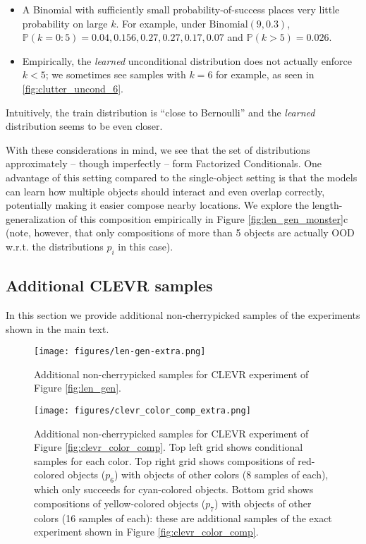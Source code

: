 \vspace{-1em}
\begin{itemize}
\item A Binomial with sufficiently small probability-of-success places very little probability on large $k$. For example, under $\text{Binomial}(9, 0.3)$, $\mathbb{P}(k=0:5) = 0.04, 0.156, 0.27, 0.27, 0.17, 0.07$ and $\mathbb{P}(k>5) = 0.026$.
\vspace{-0.5em}
\item Empirically, the \emph{learned} unconditional distribution does not actually enforce $k<5$; we sometimes see samples with $k=6$ for example, as seen in \cref{fig:clutter_uncond_6}.
\end{itemize}
\vspace{-1em}
Intuitively, the train distribution is ``close to Bernoulli'' and the \emph{learned} distribution seems to be even closer.

With these considerations in mind, we see that the set of distributions approximately -- though imperfectly -- form
Factorized Conditionals. One advantage of this setting compared to the single-object setting is that the models can learn how multiple objects should interact and even overlap correctly, potentially making it easier compose nearby locations. We explore the length-generalization of this composition empirically in Figure \ref{fig:len_gen_monster}c (note, however, that only compositions of more than 5 objects are actually OOD w.r.t. the distributions $p_i$ in this case).


\subsection{Additional CLEVR samples}
In this section we provide additional non-cherrypicked samples of the experiments shown in the main text.

\begin{figure}[ht]
\vskip 0.2in
\begin{center}
\centerline{
\texttt{[image: figures/len-gen-extra.png]}
}
\caption{Additional non-cherrypicked samples for CLEVR experiment of Figure \ref{fig:len_gen}.}
\label{fig:len_gen_extra}
\end{center}
\vskip -0.2in
\end{figure}



\begin{figure}[hb]
\vskip 0.2in
\begin{center}
\centerline{
\texttt{[image: figures/clevr\_color\_comp\_extra.png]}
}
\caption{Additional non-cherrypicked samples for CLEVR experiment of Figure \ref{fig:clevr_color_comp}. Top left grid shows conditional samples for each color. Top right grid shows compositions of red-colored objects ($p_6$) with objects of other colors (8 samples of each), which only succeeds for cyan-colored objects. Bottom grid shows compositions of yellow-colored objects ($p_7$) with objects of other colors (16 samples of each): these are additional samples of the exact experiment shown in Figure \ref{fig:clevr_color_comp}.}
\label{fig:clever_color_comp_extra}
\end{center}
\vskip -0.2in
\end{figure}
